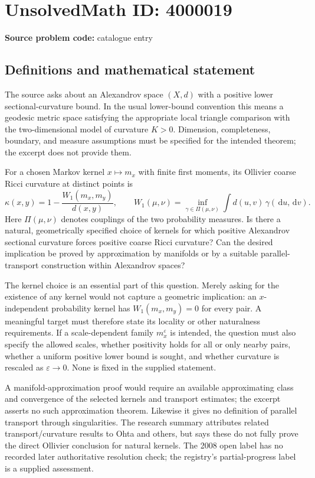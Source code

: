 \documentclass[11pt]{article}
\newcommand{\dd}{\,\mathrm{d}}
\begin{document}
\section*{UnsolvedMath ID: 4000019}
\textbf{Source problem code:} catalogue entry
\subsection{Definitions and mathematical statement}
The source asks about an Alexandrov space \((X,d)\) with a positive lower sectional-curvature bound. In the usual lower-bound convention this means a geodesic metric space satisfying the appropriate local triangle comparison with the two-dimensional model of curvature \(K>0\). Dimension, completeness, boundary, and measure assumptions must be specified for the intended theorem; the excerpt does not provide them.

For a chosen Markov kernel \(x\mapsto m_x\) with finite first moments, its Ollivier coarse Ricci curvature at distinct points is
\[
 \kappa(x,y)=1-\frac{W_1(m_x,m_y)}{d(x,y)},\qquad
 W_1(\mu,\nu)=\inf_{\gamma\in\Pi(\mu,\nu)}\int d(u,v)\,\gamma(\dd u,\dd v).
\]
Here \(\Pi(\mu,\nu)\) denotes couplings of the two probability measures. Is there a natural, geometrically specified choice of kernels for which positive Alexandrov sectional curvature forces positive coarse Ricci curvature? Can the desired implication be proved by approximation by manifolds or by a suitable parallel-transport construction within Alexandrov spaces?

The kernel choice is an essential part of this question. Merely asking for the existence of any kernel would not capture a geometric implication: an \(x\)-independent probability kernel has \(W_1(m_x,m_y)=0\) for every pair. A meaningful target must therefore state its locality or other naturalness requirements. If a scale-dependent family \(m_x^{\varepsilon}\) is intended, the question must also specify the allowed scales, whether positivity holds for all or only nearby pairs, whether a uniform positive lower bound is sought, and whether curvature is rescaled as \(\varepsilon\to0\). None is fixed in the supplied statement.

A manifold-approximation proof would require an available approximating class and convergence of the selected kernels and transport estimates; the excerpt asserts no such approximation theorem. Likewise it gives no definition of parallel transport through singularities. The research summary attributes related transport/curvature results to Ohta and others, but says these do not fully prove the direct Ollivier conclusion for natural kernels. The 2008 open label has no recorded later authoritative resolution check; the registry's partial-progress label is a supplied assessment.
\end{document}
